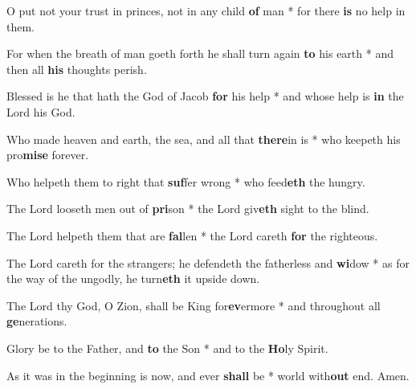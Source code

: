 \begin{multicols}{2}
	O put not your trust in princes, not in any child \textbf{of} man * for there \textbf{is} no help in them.
	
	For when the breath of man goeth forth he shall turn again \textbf{to} his earth * and then all \textbf{his} thoughts perish.
	
	Blessed is he that hath the God of Jacob \textbf{for} his help * and whose help is \textbf{in} the Lord his God.
	
	Who made heaven and earth, the sea, and all that \textbf{there}in is * who keepeth his pro\textbf{mise} forever.
	
	Who helpeth them to right that \textbf{suf}fer wrong * who feed\textbf{eth} the hungry.
	
	The Lord looseth men out of \textbf{pri}son * the Lord giv\textbf{eth} sight to the blind.
	
	The Lord helpeth them that are \textbf{fal}len * the Lord careth \textbf{for} the righteous.
	
	The Lord careth for the strangers; he defendeth the fatherless and \textbf{wi}dow * as for the way of the ungodly, he turn\textbf{eth} it upside down.
	
	The Lord thy God, O Zion, shall be King for\textbf{ev}ermore * and throughout all \textbf{ge}nerations.
	
	Glory be to the Father, and \textbf{to} the Son * and to the \textbf{Ho}ly Spirit.
	
	As it was in the beginning is now, and ever \textbf{shall} be * world with\textbf{out} end. Amen.
\end{multicols}